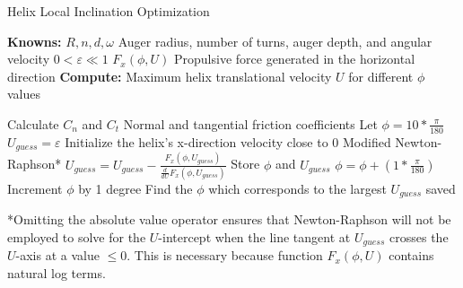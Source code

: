 \documentclass[letterpaper, 11 pt]{article}
\begin{document}
\begin{algorithm}[H]
	\caption{Helix Local Inclination Optimization}
	\label{augerOpt}
	
	\begin{algorithmic} %
	\State \textbf{Knowns:}
	\State $R, n, d, \omega$ \Comment Auger radius, number of turns, auger depth, and angular velocity
	\State $0<\varepsilon \ll 1$
	\State $F_x(\phi,U)$ \Comment Propulsive force generated in the horizontal direction
	\State
	\State \textbf{Compute:} Maximum helix translational velocity $U$ for different $\phi$ values
	\end{algorithmic}
	
	\begin{algorithmic}[1] %
	\State Calculate $C_n$ and $C_t$ \Comment Normal and tangential friction coefficients 
	\State Let $\phi = 10*\frac{\pi}{180}$
		\State $U_{guess} = \varepsilon$ \Comment Initialize the helix's x-direction velocity close to 0 
		 \Comment Modified Newton-Raphson*
			\State $U_{guess} = U_{guess} - \frac{F_x(\phi, U_{guess})}{\frac{d}{dU}F_x(\phi,U_{guess})}$
		\EndWhile
		\State Store $\phi$ and $U_{guess}$ 
		\State $\phi = \phi + (1*\frac{\pi}{180})$ \Comment Increment $\phi$ by 1 degree
	\EndWhile
	\State Find the $\phi$ which corresponds to the largest $U_{guess}$ saved
	\end{algorithmic}
\end{algorithm}
*Omitting the absolute value operator ensures that Newton-Raphson will not be employed to solve for the $U$-intercept when the line tangent at $U_{guess}$ crosses the $U$-axis at a value $\leq 0$. This is necessary because function $F_x(\phi,U)$ contains natural log terms.   
\end{document}
